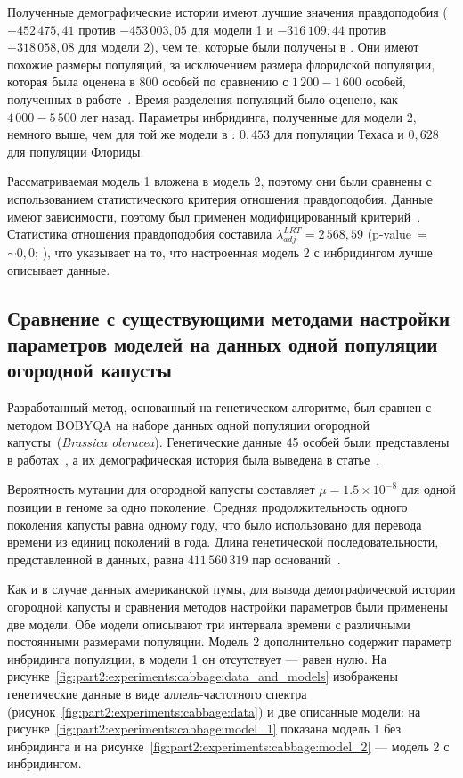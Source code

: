 Полученные демографические истории имеют лучшие значения правдоподобия ($-452{\,}475{,}41$ против $-453{\,}003{,}05$ для модели 1 и $-316{\,}109{,}44$ против $-318{\,}058{,}08$ для модели 2), чем те, которые были получены в \cite{blischak2020inferring}.
Они имеют похожие размеры популяций, за исключением размера флоридской популяции, которая была оценена в 800 особей по сравнению с $1{\,}200 - 1{\,}600$ особей, полученных в работе~\cite{blischak2020inferring}.
Время разделения популяций было оценено, как $4{\,}000 - 5{\,}500$ лет назад.
Параметры инбридинга, полученные для модели 2, немного выше, чем для той же модели в \cite{blischak2020inferring}: $0{,}453$ для популяции Техаса и $0{,}628$ для популяции Флориды.

Рассматриваемая модель 1 вложена в модель 2, поэтому они были сравнены с использованием статистического критерия отношения правдоподобия.
Данные имеют зависимости, поэтому был применен модифицированный критерий~\cite{coffman2016computationally}.
Статистика отношения правдоподобия составила $\lambda^{LRT}_{adj} = 2{\,}568{,}59$ (p-value~=~${\sim}0{,}0$; \cite{coffman2016computationally}), что указывает на то, что настроенная модель 2 с инбридингом лучше описывает данные.



\FloatBarrier
\subsection{Сравнение с существующими методами настройки параметров моделей на данных одной популяции огородной капусты}

Разработанный метод, основанный на генетическом алгоритме, был сравнен с методом BOBYQA на наборе данных одной популяции огородной капусты~(\textit{Brassica oleracea}).
Генетические данные 45 особей были представлены в работах~\cite{cheng2016genome, cheng2016subgenome}, а их демографическая история была выведена в статье~\cite{blischak2020inferring}.

Вероятность мутации для огородной капусты составляет $\mu = 1.5 \times 10^{-8}$ для одной позиции в геноме за одно поколение.
Средняя продолжительность одного поколения капусты равна одному году, что было использовано для перевода времени из единиц поколений в года.
Длина генетической последовательности, представленной в данных, равна $411{\,}560{\,}319$ пар оснований~\cite{cheng2016genome, cheng2016subgenome}.

Как и в случае данных американской пумы, для вывода демографической истории огородной капусты и сравнения методов настройки параметров были применены две модели.
Обе модели описывают три интервала времени с различными постоянными размерами популяции.
Модель 2 дополнительно содержит параметр инбридинга популяции, в модели 1 он отсутствует --- равен нулю.
На рисунке~\ref{fig:part2:experiments:cabbage:data_and_models} изображены генетические данные в виде аллель-частотного спектра (рисунок~\ref{fig:part2:experiments:cabbage:data}) и две описанные модели: на рисунке~\ref{fig:part2:experiments:cabbage:model_1} показана модель 1 без инбридинга и на рисунке~\ref{fig:part2:experiments:cabbage:model_2} --- модель 2 с инбридингом.

